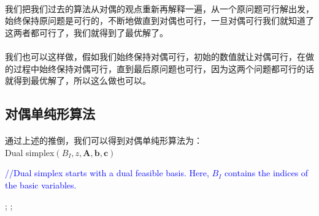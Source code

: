 		\paragraph{}我们把我们过去的算法从对偶的观点重新再解释一遍，从一个原问题可行解出发，始终保持原问题是可行的，不断地做直到对偶也可行，一旦对偶可行我们就知道了这两者都可行了，我们就得到了最优解了。
		\paragraph{}我们也可以这样做，假如我们始终保持对偶可行，初始的数值就让对偶可行，在做的过程中始终保持对偶可行，直到最后原问题也可行，因为这两个问题都可行的话就得到最优解了，所以这么做也可以。
	\subsection{对偶单纯形算法}
	\paragraph{}通过上述的推倒，我们可以得到对偶单纯形算法为：\\
{\sc Dual simplex}$(B_I, z, \mathbf{A, b, c})$
	\begin{algorithmic}[1]
\STATE \begin{footnotesize}\textcolor{blue}{//{\sc Dual simplex} starts with a dual feasible basis. Here, $B_I$ contains the indices of the basic variables.}\end{footnotesize} 
;
\ENDIF;
\ELSE
{}
\ENDIF
\ENDFOR
{} 
\ENDIF
{}
\ENDWHILE
\end{algorithmic}
